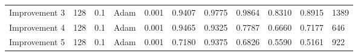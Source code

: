 \begin{landscape}
\begin{table}
\begin{tabular}{l|l|l|l|l|l|l|l|l|l|l}
    Improvement 3 & 128 & 0.1 & Adam & 0.001 & 0.9407 & 0.9775 & 0.9864 & 0.8310 & 0.8915 & 1389 \\
    Improvement 4 & 128 & 0.1 & Adam & 0.001 & 0.9465 & 0.9325 & 0.7787 & 0.6660 & 0.7177 & 646 \\
    Improvement 5 & 128 & 0.1 & Adam & 0.001 & 0.7180 & 0.9375 & 0.6826 & 0.5590 & 0.5161 & 922
    \end{tabular}
    \label{fig:xception-improvement-results}
\end{table}
\end{landscape}